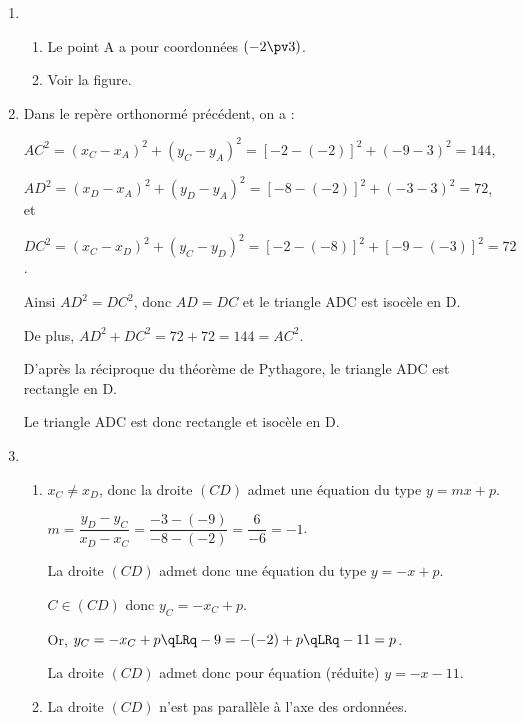 \documentclass[10pt,french]{article}
\begin{document}
\begin{enumerate}[label=\arabic*.]
\item 	\begin{enumerate}[label=\alph*)]
	\item %
	Le point A a pour coordonnées $(-2\pv 3)$.

	\item %
	Voir la figure.
	
	
	\end{enumerate}

\item %
	Dans le repère orthonormé précédent, on a :
	
	$AC^2=\left( x_C-x_A\right)^2+\left( y_C-y_A\right)^2=[-2-(-2)]^2+(-9-3)^2=144$,
	
	$AD^2=\left( x_D-x_A\right)^2+\left( y_D-y_A\right)^2=[-8-(-2)]^2+(-3-3)^2=72$, et
	
	$DC^2=\left( x_C-x_D\right)^2+\left( y_C-y_D\right)^2=[-2-(-8)]^2+[-9-(-3)]^2=72$.
	
	Ainsi $AD^2=DC^2$, donc $AD=DC$ et le triangle ADC est isocèle en D.
	
	De plus, $AD^2+DC^2=72+72=144=AC^2$.
	
	D'après la réciproque du théorème de Pythagore, le triangle ADC est rectangle en D.
	
	Le triangle ADC est donc rectangle et isocèle en D.

\item 	\begin{enumerate}[label=\alph*)]
	\item %
	$x_C\neq x_D$, donc la droite $(CD)$ admet une équation du type $y=mx+p$.
	
	$m=\dfrac{y_D-y_C}{x_D-x_C}=\dfrac{-3-(-9)}{-8-(-2)}=\dfrac{6}{-6}=-1$.
	
	La droite $(CD)$ admet donc une équation du type $y=-x+p$.
	
	$C\in (CD)$ donc $y_C=-x_C+p$.
	
	Or, $y_C=-x_C+p\qLRq -9=-(-2)+p\qLRq -11=p$.
	
	La droite $(CD)$ admet donc pour équation (réduite) $y=-x-11$.
	
	\item %
	La droite $(CD)$ n'est pas parallèle à l'axe des ordonnées.
	

\end{enumerate}
\end{enumerate}
\end{document}
